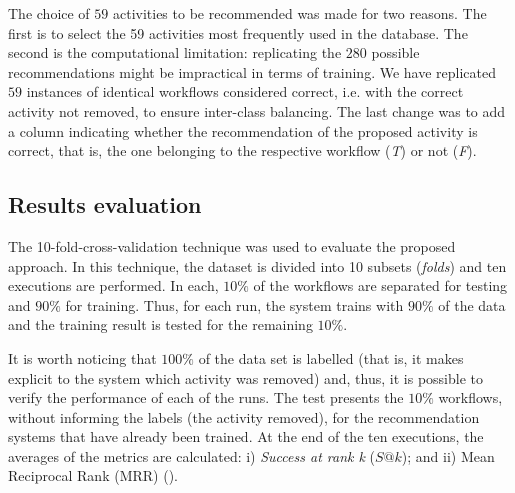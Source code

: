 \documentclass{doublecol-new}
\theoremstyle{TH}{
\newtheorem{lemma}{Lemma}
\newtheorem{theorem}[lemma]{Theorem}
\newtheorem{corrolary}[lemma]{Corrolary}
\newtheorem{conjecture}[lemma]{Conjecture}
\newtheorem{proposition}[lemma]{Proposition}
\newtheorem{claim}[lemma]{Claim}
\newtheorem{stheorem}[lemma]{Wrong Theorem}
\newtheorem{algorithm}{Algorithm}
}
\theoremstyle{THrm}{
\newtheorem{definition}{Definition}[section]
\newtheorem{question}{Question}[section]
\newtheorem{remark}{Remark}
\newtheorem{scheme}{Scheme}
}
\theoremstyle{THhit}{
\newtheorem{case}{Case}[section]
}
\begin{document}
The choice of \(59\) activities to be recommended was made for two reasons. The first is to select the 59 activities most frequently used in the database. The second is the computational limitation: replicating the \(280\) possible recommendations might be impractical in terms of training. We have replicated \(59\) instances of identical workflows considered correct, i.e. with the correct activity not removed, to ensure inter-class balancing. The last change was to add a column indicating whether the recommendation of the proposed activity is correct, that is, the one belonging to the respective workflow (\emph{T}) or not (\emph{F}).

\subsection*{Results evaluation}
The 10-fold-cross-validation technique was used to evaluate the proposed approach. In this technique, the dataset is divided into 10 subsets (\emph{folds}) and ten executions are performed. In each, \(10\%\) of the workflows are separated for testing and \(90\%\) for training. Thus, for each run, the system trains with \(90\%\) of the data and the training result is tested for the remaining \(10​​\%\).

It is worth noticing that \(100\%\) of the data set is labelled (that is, it makes explicit to the system which activity was removed) and, thus, it is possible to verify the performance of each of the runs. The test presents the \(10​​\%\) workflows, without informing the labels (the activity removed), for the recommendation systems that have already been trained. At the end of the ten executions, the averages of the metrics are calculated: i) \emph{Success at rank k} (\(S@k\)); and ii) Mean Reciprocal Rank (MRR) (\cite{Harvey2010}).
\end{document}

